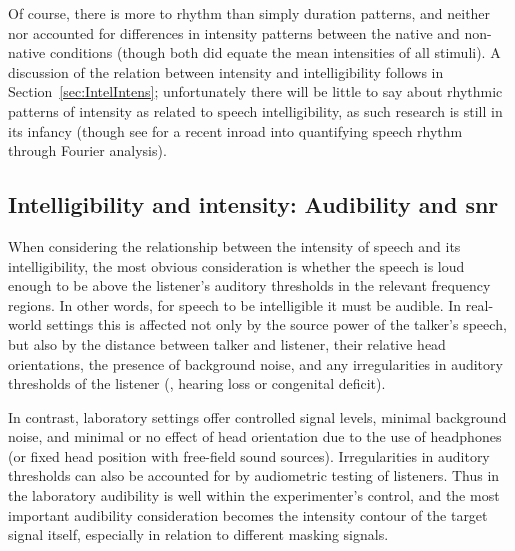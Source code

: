 Of course, there is more to rhythm than simply duration patterns, and neither \citet{QueneVanDelft2010} nor \citet{CushingDellwo2010} accounted for differences in intensity patterns between the native and non-native conditions (though both did equate the mean intensities of all stimuli).  A discussion of the relation between intensity and intelligibility follows in Section~\ref{sec:IntelIntens}; unfortunately there will be little to say about rhythmic patterns of intensity as related to speech intelligibility, as such research is still in its infancy (though see \citealt{TilsenJohnson2008} for a recent inroad into quantifying speech rhythm through Fourier analysis).


\subsection[Intelligibility and intensity]{Intelligibility and intensity: Audibility and \ac{snr}\label{sec:IntelIntens}}
When considering the relationship between the intensity of speech and its intelligibility, the most obvious consideration is whether the speech is loud enough to be above the listener’s auditory thresholds in the relevant frequency regions.  In other words, for speech to be intelligible it must be audible.  In real-world settings this is affected not only by the source power of the talker’s speech, but also by the distance between talker and listener, their relative head orientations, the presence of background noise, and any irregularities in auditory thresholds of the listener (\ie, hearing loss or congenital deficit).

In contrast, laboratory settings offer controlled signal levels, minimal background noise, and minimal or no effect of head orientation due to the use of headphones (or fixed head position with free-field sound sources).  Irregularities in auditory thresholds can also be accounted for by audiometric testing of listeners.  Thus in the laboratory audibility is well within the experimenter’s control, and the most important audibility consideration becomes the intensity contour of the target signal itself, especially in relation to different masking signals.%

